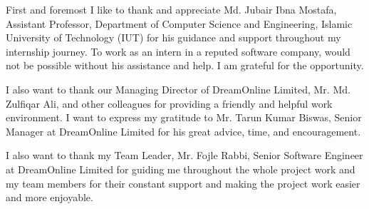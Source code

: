 \begin{flushleft}
First and foremost I like to thank and appreciate Md. Jubair Ibna Mostafa, Assistant Professor,
Department of Computer Science and Engineering, Islamic University of Technology (IUT) for
his guidance and support throughout my internship journey. To work as an intern in a reputed
software company, would not be possible without his assistance and help. I am grateful for the
opportunity.

\vspace{10pt} 

I also want to thank our Managing Director of DreamOnline Limited, Mr. Md. Zulfiqar Ali, and
other colleagues for providing a friendly and helpful work environment. I want to express my
gratitude to Mr. Tarun Kumar Biswas, Senior Manager at DreamOnline Limited for his great
advice, time, and encouragement.

\vspace{10pt}

I also want to thank my Team Leader, Mr. Fojle Rabbi, Senior Software Engineer at
DreamOnline Limited for guiding me throughout the whole project work and my team members
for their constant support and making the project work easier and more enjoyable.
\end{flushleft}
